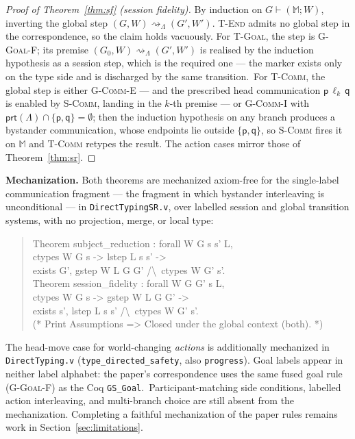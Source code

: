 \documentclass{article}
\theoremstyle{plain}
\theoremstyle{definition}
\newcommand{\reach}{\rightsquigarrow}
\newcommand{\id}[1]{\texttt{#1}}
\newcommand{\MM}{\mathbb{M}}
\newcommand{\prt}[1]{\mathsf{prt}(#1)}
\def \bgc {}
\def \egc {}
\begin{document}
\begin{proof}[Proof of Theorem~\ref{thm:sf} (session fidelity)]
By induction on $G\vdash(\MM;W)$, inverting the global step
$(G,W)\reach_\Lambda(G',W')$. \bgc\textsc{T-End} admits no global step in the
correspondence, so the claim holds vacuously.
For \textsc{T-Goal}, the step is \textsc{G-Goal-F}; its premise
$(G_0,W)\reach_\Lambda(G',W')$ is realised by the induction hypothesis as a
session step, which is the required one --- the marker exists only on the type
side and is discharged by the same transition.\egc\ For
\textsc{T-Comm}, the global step is either \textsc{G-Comm-E} --- and the
prescribed head communication $\mathsf p\,\ell_k\,\mathsf q$ is enabled by
\textsc{S-Comm}, landing in the $k$-th premise --- or \textsc{G-Comm-I} with
$\prt\Lambda\cap\{\mathsf p,\mathsf q\}=\emptyset$; then the induction
hypothesis on any branch produces a bystander communication, whose endpoints lie
outside $\{\mathsf p,\mathsf q\}$, so \textsc{S-Comm} fires it on $\MM$ and
\textsc{T-Comm} retypes the result. The action cases mirror those of
Theorem~\ref{thm:sr}.
\end{proof}

\noindent\textbf{Mechanization.} Both theorems are mechanized axiom-free for the
single-label communication fragment --- the fragment in which bystander
interleaving is unconditional --- in \id{DirectTypingSR.v}, over labelled
session and global transition systems, with no projection, merge, or local type:
\begin{quote}\small\ttfamily
Theorem subject\_reduction : forall W G s s' L,\\
\quad ctypes W G s -> lstep L s s' ->\\
\quad exists G', gstep W L G G' /\textbackslash\ ctypes W G' s'.\\
Theorem session\_fidelity : forall W G G' s L,\\
\quad ctypes W G s -> gstep W L G G' ->\\
\quad exists s', lstep L s s' /\textbackslash\ ctypes W G' s'.\\
(* Print Assumptions => Closed under the global context (both). *)
\end{quote}
The head-move case for world-changing \emph{actions} is additionally mechanized
in \id{DirectTyping.v} (\id{type\_directed\_safety}, also \id{progress}).
\bgc Goal labels appear in neither label alphabet: the paper's correspondence
uses the same fused goal rule (\textsc{G-Goal-F}) as the Coq \id{GS\_Goal}.\egc\
Participant-matching side conditions, labelled action
interleaving, and multi-branch choice are \bgc still absent from the
mechanization\egc. Completing a faithful
mechanization of the paper rules remains work in Section~\ref{sec:limitations}.
\end{document}
